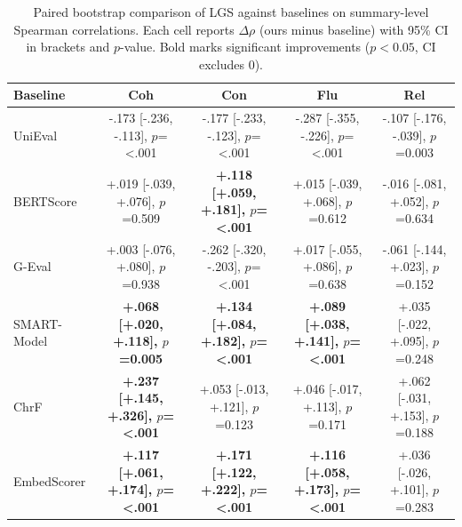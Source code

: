 \begin{table}[t]
\centering
\caption{Paired bootstrap comparison of LGS against baselines on summary-level Spearman correlations. Each cell reports $\Delta\rho$ (ours minus baseline) with 95\% CI in brackets and $p$-value. Bold marks significant improvements ($p<0.05$, CI excludes 0).}
\label{tab:compare_lgs_summary}
\begin{tabular}{lcccc}
\toprule
Baseline & Coh & Con & Flu & Rel \\
\midrule
UniEval & -.173 {\scriptsize [-.236, -.113], $p$=<.001} & -.177 {\scriptsize [-.233, -.123], $p$=<.001} & -.287 {\scriptsize [-.355, -.226], $p$=<.001} & -.107 {\scriptsize [-.176, -.039], $p$=0.003} \\
BERTScore & +.019 {\scriptsize [-.039, +.076], $p$=0.509} & \textbf{+.118 {\scriptsize [+.059, +.181], $p$=<.001}} & +.015 {\scriptsize [-.039, +.068], $p$=0.612} & -.016 {\scriptsize [-.081, +.052], $p$=0.634} \\
G-Eval & +.003 {\scriptsize [-.076, +.080], $p$=0.938} & -.262 {\scriptsize [-.320, -.203], $p$=<.001} & +.017 {\scriptsize [-.055, +.086], $p$=0.638} & -.061 {\scriptsize [-.144, +.023], $p$=0.152} \\
SMART-Model & \textbf{+.068 {\scriptsize [+.020, +.118], $p$=0.005}} & \textbf{+.134 {\scriptsize [+.084, +.182], $p$=<.001}} & \textbf{+.089 {\scriptsize [+.038, +.141], $p$=<.001}} & +.035 {\scriptsize [-.022, +.095], $p$=0.248} \\
ChrF & \textbf{+.237 {\scriptsize [+.145, +.326], $p$=<.001}} & +.053 {\scriptsize [-.013, +.121], $p$=0.123} & +.046 {\scriptsize [-.017, +.113], $p$=0.171} & +.062 {\scriptsize [-.031, +.153], $p$=0.188} \\
EmbedScorer & \textbf{+.117 {\scriptsize [+.061, +.174], $p$=<.001}} & \textbf{+.171 {\scriptsize [+.122, +.222], $p$=<.001}} & \textbf{+.116 {\scriptsize [+.058, +.173], $p$=<.001}} & +.036 {\scriptsize [-.026, +.101], $p$=0.283} \\
\bottomrule
\end{tabular}
\end{table}
